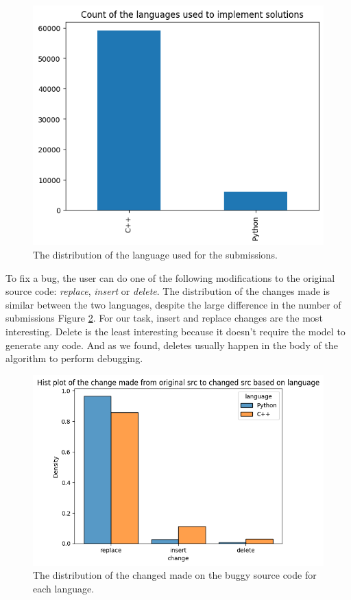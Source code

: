 \documentclass[12pt,a4paper]{report}
\begin{document}
\begin{figure}[hp!]
\centering
\includegraphics[width=\textwidth]{pics/submissioncount.png}
  \caption{The distribution of the language used for the submissions.}
  \label{fig:dataseteda1}
\end{figure}

\newpage

To fix a bug, the user can do one of the following modifications to the original source code: \textit{replace}, \textit{insert} or \textit{delete}. The distribution of the changes made is similar between the two languages, despite the large difference in the number of submissions Figure \ref{fig:dataseteda2}. For our task, insert and replace changes are the most interesting. Delete is the least interesting because it doesn't require the model to generate any code. And as we found, deletes usually happen in the body of the algorithm to perform debugging.

\begin{figure}[hp!]
\centering
\includegraphics[width=\textwidth]{pics/submissionchange.png}
  \caption{The distribution of the changed made on the buggy source code for each language.}
  \label{fig:dataseteda2}
\end{figure}
\end{document}

